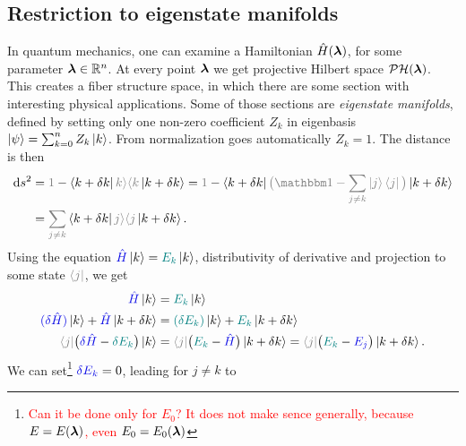 \subsection{Restriction to eigenstate manifolds}
In quantum mechanics, one can examine a Hamiltonian $\hat{H}({\bm\lambda})$, for some parameter ${\bm\lambda}\in \mathbb{R}^n$. At every point ${\bm\lambda}$ we get projective Hilbert space $\mathcal{PH}({\bm\lambda})$. This creates a fiber structure space, in which there are some section with interesting physical applications. Some of those sections are \emph{eigenstate manifolds}, defined by setting only one non-zero coefficient $Z_k$ in eigenbasis $\ket{\psi}=\sum_{k=0}^n Z_k \ket{k}$. From normalization goes automatically $Z_k=1$. The distance is then
\begin{equation}
    \begin{split}
        \d s^2 &= \textcolor{gray}{1}-\bra{k+\delta k}\textcolor{gray}{k\rangle \langle k}\ket{k+\delta k}=\textcolor{gray}{1}-\bra{k+\delta k}\textcolor{gray}{\big(\Id-\sum_{j\neq k} \ket{j}\bra{j}\big)}\ket{k+\delta k} \\
        &= \textcolor{gray}{\sum_{j\neq k}}\bra{k+\delta k}\textcolor{gray}{j\rangle \langle j}\ket{k+\delta k}.
        \label{eq:dsDerivation}
    \end{split}
\end{equation}
Using the \Schrodinger equation $\textcolor{blue}{\HH}\ket{k}=\textcolor{teal}{E_k} \ket{k}$, distributivity of derivative and projection to some state $\textcolor{gray}{\bra{j}}$, we get
\begin{equation}
    \begin{split}
        \textcolor{blue}{\HH}\ket{k} &= \textcolor{teal}{E_k}\ket{k}\\
        \textcolor{blue}{(\delta \HH)}\ket{k} +\textcolor{blue}{\HH}\ket{k+\delta k} &=\textcolor{teal}{(\delta E_k)}\ket{k} +\textcolor{teal}{E_k}\ket{k+\delta k}\\
         \textcolor{gray}{\bra{j}}\big(\textcolor{blue}{\delta \HH}-\textcolor{teal}{\delta E_k}\big)\ket{k}&=\textcolor{gray}{\bra{j}}\big(\textcolor{teal}{E_k}-\textcolor{blue}{\HH}\big)\ket{k+\delta k}=\textcolor{gray}{\bra{j}}\big(\textcolor{teal}{E_k}-\textcolor{blue}{E_j}\big)\ket{k+\delta k}.
    \end{split}
\end{equation}
We can set\footnote{\textcolor{red}{Can it be done only for $E_0$? It does not make sence generally, because $E=E({\bm\lambda})$, even $E_0=E_0({\bm\lambda})$}} $\textcolor{blue}{\delta E_k}=0$, leading for $j\neq k$ to
